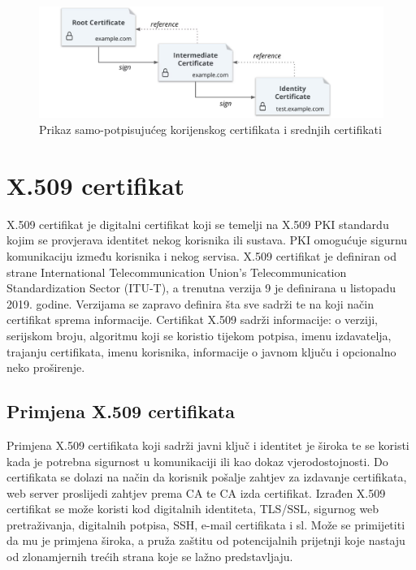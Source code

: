 \documentclass[]{foi}
\begin{document}
\begin{figure}[htbp]
    \centering
    \includegraphics[width=1.0\textwidth]{assets/hashicorp-certificates.png}
    \caption{Prikaz samo-potpisujućeg korijenskog certifikata i srednjih certifikati \cite{hashicorp-vault-pki-engine}}
\end{figure}


\chapter{X.509 certifikat}

X.509 certifikat je digitalni certifikat koji se temelji na X.509 PKI standardu kojim se provjerava identitet nekog korisnika ili sustava.
PKI omogućuje sigurnu komunikaciju između korisnika i nekog servisa.
X.509 certifikat je definiran od strane International Telecommunication Union's Telecommunication Standardization Sector (ITU-T), a trenutna verzija 9 je definirana u listopadu 2019. godine.
Verzijama se zapravo definira šta sve sadrži te na koji način certifikat sprema informacije.
Certifikat X.509 sadrži informacije: o verziji, serijskom broju, algoritmu koji se koristio tijekom potpisa, imenu izdavatelja, trajanju certifikata, imenu korisnika, informacije o javnom ključu i opcionalno neko proširenje.
\cite{techtarget-x509-certificate}

\section{Primjena X.509 certifikata}

Primjena X.509 certifikata koji sadrži javni ključ i identitet je široka te se koristi kada je potrebna sigurnost u komunikaciji ili kao dokaz vjerodostojnosti.
Do certifikata se dolazi na način da korisnik pošalje zahtjev za izdavanje certifikata, web server proslijedi zahtjev prema CA te CA izda certifikat.
Izrađen X.509 certifikat se može koristi kod digitalnih identiteta, TLS/SSL, sigurnog web pretraživanja, digitalnih potpisa, SSH, e-mail certifikata i sl.
Može se primijetiti da mu je primjena široka, a pruža zaštitu od potencijalnih prijetnji koje nastaju od zlonamjernih trećih strana koje se lažno predstavljaju.
\cite{techtarget-x509-certificate}
\end{document}
